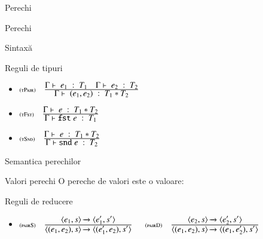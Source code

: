 \documentclass[xcolor=pdftex,romanian,colorlinks]{beamer}
\begin{document}
\begin{section}{Perechi}
\begin{frame}{Perechi}
\begin{block}{Sintaxă}
\end{block}
\begin{block}{Reguli de tipuri}
\begin{itemize}
\item[] 
$\reg[tPair]{\tjud{(e_1,e_2)}{T_1 * T_2}}{\tjud{e_1}{T_1}{}\si \tjud{e_2}{T_2}{}}{}$
\item[] $\reg[tFst]{\tjud{\terminal{fst} e}{T_1}}{\tjud{e}{T_1 * T_2}{}}{}$
\item[]
$\reg[tSnd]{\tjud{\terminal{snd} e}{T_2}}{\tjud{e}{T_1 * T_2}{}}{}$

\end{itemize}

\end{block}
\end{frame}

\begin{frame}{Semantica perechilor}
\begin{block}{Valori perechi}
O pereche de valori este o valoare:
\end{block}
\begin{block}{Reguli de reducere}
\begin{itemize}
\item[] {\small $\reg[pairS]{\Ss{\c{(e_1,e_2),s}}{\c{(e_1',e_2),s'}}}{\Ss{\c{e_1,s}}{\c{e_1',s'}}}{}$ 
\hfill $\reg[pairD]{\Ss{\c{(e_1,e_2),s}}{\c{(e_1,e_2'),s'}}}{\Ss{\c{e_2,s}}{\c{e_2',s'}}}{}$}


\end{itemize}
\end{block}
\end{frame}
\end{section}
\end{document}
